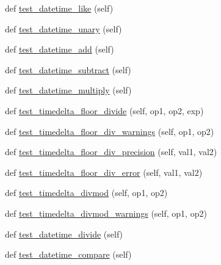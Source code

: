 \begin{DoxyCompactItemize}
\item 
def \hyperlink{classnumpy_1_1core_1_1tests_1_1test__datetime_1_1TestDateTime_a56cfff6c7e0b5ad25b521fbd049e4a37}{test\+\_\+datetime\+\_\+like} (self)
\item 
def \hyperlink{classnumpy_1_1core_1_1tests_1_1test__datetime_1_1TestDateTime_a30fa7cb8d001ba1495e905d3ff2bed6b}{test\+\_\+datetime\+\_\+unary} (self)
\item 
def \hyperlink{classnumpy_1_1core_1_1tests_1_1test__datetime_1_1TestDateTime_a1bff61a00af446864528b89927c78f87}{test\+\_\+datetime\+\_\+add} (self)
\item 
def \hyperlink{classnumpy_1_1core_1_1tests_1_1test__datetime_1_1TestDateTime_a478c60db3aaf251c1ad69bca6b459470}{test\+\_\+datetime\+\_\+subtract} (self)
\item 
def \hyperlink{classnumpy_1_1core_1_1tests_1_1test__datetime_1_1TestDateTime_a019887e6b0b9b4a63b6a8631109594ce}{test\+\_\+datetime\+\_\+multiply} (self)
\item 
def \hyperlink{classnumpy_1_1core_1_1tests_1_1test__datetime_1_1TestDateTime_aa1bd7ba417cc910392cdadd59f057def}{test\+\_\+timedelta\+\_\+floor\+\_\+divide} (self, op1, op2, exp)
\item 
def \hyperlink{classnumpy_1_1core_1_1tests_1_1test__datetime_1_1TestDateTime_a2d56b921fb851b88b9cca740d2674bbf}{test\+\_\+timedelta\+\_\+floor\+\_\+div\+\_\+warnings} (self, op1, op2)
\item 
def \hyperlink{classnumpy_1_1core_1_1tests_1_1test__datetime_1_1TestDateTime_a42bc0977f71a9f54a56d251ce2ad3ef8}{test\+\_\+timedelta\+\_\+floor\+\_\+div\+\_\+precision} (self, val1, val2)
\item 
def \hyperlink{classnumpy_1_1core_1_1tests_1_1test__datetime_1_1TestDateTime_a50f154b5acecc2b1b34d1debd1ec5a92}{test\+\_\+timedelta\+\_\+floor\+\_\+div\+\_\+error} (self, val1, val2)
\item 
def \hyperlink{classnumpy_1_1core_1_1tests_1_1test__datetime_1_1TestDateTime_ae748d2ad7580a6cc5e68fdc14e6254c6}{test\+\_\+timedelta\+\_\+divmod} (self, op1, op2)
\item 
def \hyperlink{classnumpy_1_1core_1_1tests_1_1test__datetime_1_1TestDateTime_ac2be1f330233b843b64daa1dad526a0c}{test\+\_\+timedelta\+\_\+divmod\+\_\+warnings} (self, op1, op2)
\item 
def \hyperlink{classnumpy_1_1core_1_1tests_1_1test__datetime_1_1TestDateTime_a5226a3b21deff84ae41ef7d32c9d105e}{test\+\_\+datetime\+\_\+divide} (self)
\item 
def \hyperlink{classnumpy_1_1core_1_1tests_1_1test__datetime_1_1TestDateTime_acb08bab76826a621d913aca063dc2b35}{test\+\_\+datetime\+\_\+compare} (self)

\end{DoxyCompactItemize}

